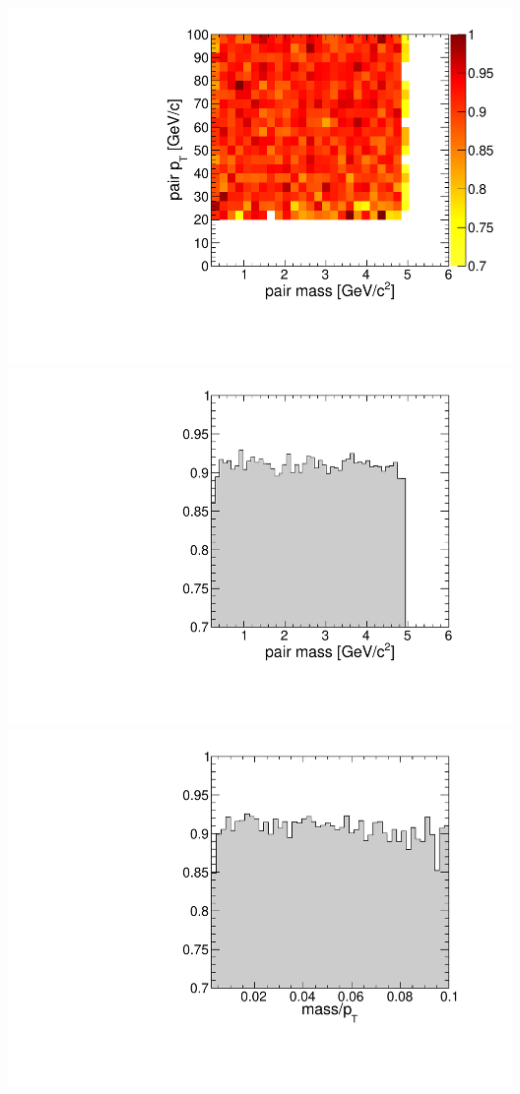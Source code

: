 \documentclass[compress]{beamer}
\begin{document}
\begin{frame}
\includegraphics[width=0.32\linewidth]{eff_trigger_inplateau_masspt.pdf}
\includegraphics[width=0.32\linewidth]{eff_trigger_inplateau_massonly.pdf}
\includegraphics[width=0.32\linewidth]{eff_trigger_inplateau_oneovergamma.pdf}
\end{frame}
\end{document}
